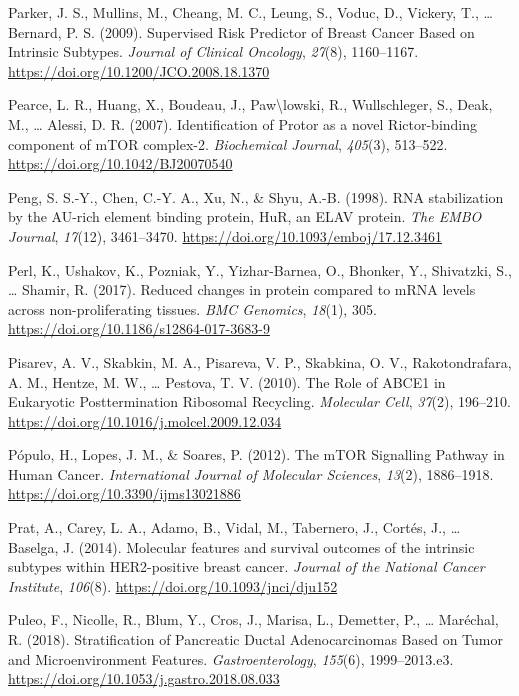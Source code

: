\documentclass[12pt,openany]{book}
\begin{document}
\hypertarget{ref-Parker2009}{}
Parker, J. S., Mullins, M., Cheang, M. C., Leung, S., Voduc, D.,
Vickery, T., \ldots{} Bernard, P. S. (2009). Supervised Risk Predictor
of Breast Cancer Based on Intrinsic Subtypes. \emph{Journal of Clinical
Oncology}, \emph{27}(8), 1160--1167.
\url{https://doi.org/10.1200/JCO.2008.18.1370}

\hypertarget{ref-Pearce2007}{}
Pearce, L. R., Huang, X., Boudeau, J., Paw\textbackslash{}lowski, R.,
Wullschleger, S., Deak, M., \ldots{} Alessi, D. R. (2007).
Identification of Protor as a novel Rictor-binding component of mTOR
complex-2. \emph{Biochemical Journal}, \emph{405}(3), 513--522.
\url{https://doi.org/10.1042/BJ20070540}

\hypertarget{ref-Peng1998}{}
Peng, S. S.-Y., Chen, C.-Y. A., Xu, N., \& Shyu, A.-B. (1998). RNA
stabilization by the AU-rich element binding protein, HuR, an ELAV
protein. \emph{The EMBO Journal}, \emph{17}(12), 3461--3470.
\url{https://doi.org/10.1093/emboj/17.12.3461}

\hypertarget{ref-Perl2017}{}
Perl, K., Ushakov, K., Pozniak, Y., Yizhar-Barnea, O., Bhonker, Y.,
Shivatzki, S., \ldots{} Shamir, R. (2017). Reduced changes in protein
compared to mRNA levels across non-proliferating tissues. \emph{BMC
Genomics}, \emph{18}(1), 305.
\url{https://doi.org/10.1186/s12864-017-3683-9}

\hypertarget{ref-Pisarev2010}{}
Pisarev, A. V., Skabkin, M. A., Pisareva, V. P., Skabkina, O. V.,
Rakotondrafara, A. M., Hentze, M. W., \ldots{} Pestova, T. V. (2010).
The Role of ABCE1 in Eukaryotic Posttermination Ribosomal Recycling.
\emph{Molecular Cell}, \emph{37}(2), 196--210.
\url{https://doi.org/10.1016/j.molcel.2009.12.034}

\hypertarget{ref-Populo2012}{}
Pópulo, H., Lopes, J. M., \& Soares, P. (2012). The mTOR Signalling
Pathway in Human Cancer. \emph{International Journal of Molecular
Sciences}, \emph{13}(2), 1886--1918.
\url{https://doi.org/10.3390/ijms13021886}

\hypertarget{ref-Prat2014}{}
Prat, A., Carey, L. A., Adamo, B., Vidal, M., Tabernero, J., Cortés, J.,
\ldots{} Baselga, J. (2014). Molecular features and survival outcomes of
the intrinsic subtypes within HER2-positive breast cancer. \emph{Journal
of the National Cancer Institute}, \emph{106}(8).
\url{https://doi.org/10.1093/jnci/dju152}

\hypertarget{ref-Puleo2018}{}
Puleo, F., Nicolle, R., Blum, Y., Cros, J., Marisa, L., Demetter, P.,
\ldots{} Maréchal, R. (2018). Stratification of Pancreatic Ductal
Adenocarcinomas Based on Tumor and Microenvironment Features.
\emph{Gastroenterology}, \emph{155}(6), 1999--2013.e3.
\url{https://doi.org/10.1053/j.gastro.2018.08.033}
\end{document}
